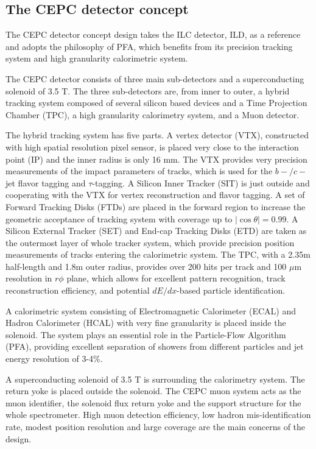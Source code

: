 \documentclass[a4paper,10pt,twoside]{cpc-hepnp}
\begin{document}
\begin{multicols}{2}
\section{The CEPC detector concept\label{sec:detector}}

The CEPC detector concept design\cite{ref:cepc_det} takes the ILC detector, ILD\cite{ref:ilc, ref:ild},
as a reference and adopts the philosophy of PFA,
which benefits from its precision tracking system and high granularity calorimetric system.

The CEPC detector consists of three main sub-detectors and a superconducting solenoid of 3.5 T.
The three sub-detectors are, from inner to outer,  a hybrid tracking system composed of several silicon based devices
and a Time Projection Chamber (TPC), a high granularity calorimetry system, and a Muon detector.

The hybrid tracking system has five parts. A vertex detector (VTX), constructed with high spatial resolution pixel sensor,
is placed very close to the interaction point (IP) and  the inner radius is only 16 mm.
The VTX provides very precision measurements of the impact parameters of tracks,
which is used for the $b-/c-$jet flavor tagging and $\tau$-tagging.
A Silicon Inner Tracker (SIT) is just outside and cooperating with the VTX for vertex reconstruction and flavor tagging.
A set of Forward Tracking Disks (FTDs) are placed in the forward region
to increase the geometric acceptance of tracking system with coverage up to $|\cos\theta| = 0.99$.
A Silicon External Tracker (SET) and End-cap Tracking Disks (ETD) are taken as the outermost layer of whole tracker system,
which provide precision position measurements of tracks entering the calorimetric system.
The TPC, with a 2.35m half-length and 1.8m outer radius, provides over 200 hits per track and 100 $\mu$m resolution in $r\phi$ plane,
which allows for excellent pattern recognition, track reconstruction efficiency, and potential $dE/dx$-based particle identification.

A calorimetric system consisting of Electromagnetic Calorimeter (ECAL) and Hadron Calorimeter (HCAL)
with very fine granularity is placed inside the solenoid.
The system plays an essential role in the Particle-Flow Algorithm (PFA),
providing excellent separation of showers from different particles and jet energy resolution of 3-4\%.

A superconducting solenoid of 3.5 T is surrounding the calorimetry system.
The return yoke is placed outside the solenoid. The CEPC muon system acts as the muon identifier,
the solenoid flux return yoke and the support structure for the whole spectrometer.
High muon detection efficiency, low hadron mis-identification rate,
modest position resolution and large coverage are the main concerns of the design.



\end{multicols}
\end{document}
